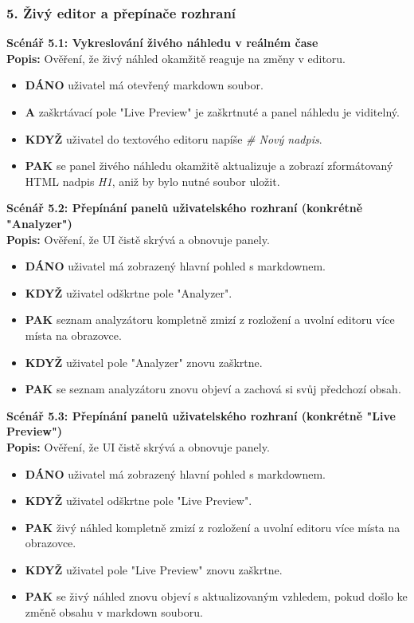 \documentclass[12pt, a4paper]{article}
\begin{document}
\subsubsection*{5. Živý editor a přepínače rozhraní}

\textbf{Scénář 5.1: Vykreslování živého náhledu v reálném čase} \\
\textbf{Popis:} Ověření, že živý náhled okamžitě reaguje na změny v editoru.
\begin{itemize}
    \item \textbf{DÁNO} uživatel má otevřený markdown soubor.
    \item \textbf{A} zaškrtávací pole "Live Preview" je zaškrtnuté a panel náhledu je viditelný.
    \item \textbf{KDYŽ} uživatel do textového editoru napíše \textit{\# Nový nadpis}.
    \item \textbf{PAK} se panel živého náhledu okamžitě aktualizuje a zobrazí zformátovaný HTML nadpis \textit{H1}, aniž by bylo nutné soubor uložit.
\end{itemize}

\textbf{Scénář 5.2: Přepínání panelů uživatelského rozhraní (konkrétně "Analyzer")} \\
\textbf{Popis:} Ověření, že UI čistě skrývá a obnovuje panely.
\begin{itemize}
    \item \textbf{DÁNO} uživatel má zobrazený hlavní pohled s markdownem.
    \item \textbf{KDYŽ} uživatel odškrtne pole "Analyzer".
    \item \textbf{PAK} seznam analyzátoru kompletně zmizí z rozložení a uvolní editoru více místa na obrazovce.
    \item \textbf{KDYŽ} uživatel pole "Analyzer" znovu zaškrtne.
    \item \textbf{PAK} se seznam analyzátoru znovu objeví a zachová si svůj předchozí obsah.
\end{itemize}

\textbf{Scénář 5.3: Přepínání panelů uživatelského rozhraní (konkrétně "Live Preview")} \\
\textbf{Popis:} Ověření, že UI čistě skrývá a obnovuje panely.
\begin{itemize}
    \item \textbf{DÁNO} uživatel má zobrazený hlavní pohled s markdownem.
    \item \textbf{KDYŽ} uživatel odškrtne pole "Live Preview".
    \item \textbf{PAK} živý náhled kompletně zmizí z rozložení a uvolní editoru více místa na obrazovce.
    \item \textbf{KDYŽ} uživatel pole "Live Preview" znovu zaškrtne.
    \item \textbf{PAK} se živý náhled znovu objeví s aktualizovaným vzhledem, pokud došlo ke změně obsahu v markdown souboru.
\end{itemize}
\end{document}
